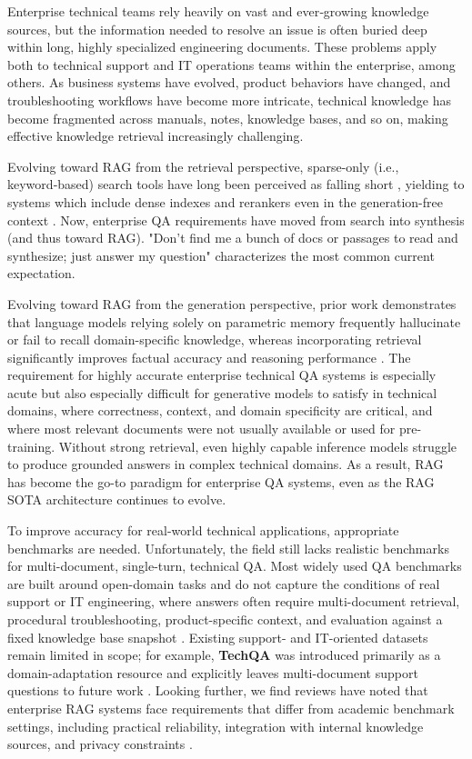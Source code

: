 \documentclass[11pt]{article}
\begin{document}
Enterprise technical teams rely heavily on vast and ever‑growing
knowledge sources, but the information needed to resolve an issue is often
buried deep within long, highly specialized engineering documents. These problems
apply both to technical support and IT operations teams within the enterprise,
among others. As business systems have evolved, product behaviors have changed, and 
troubleshooting workflows have become more intricate, technical knowledge has 
become fragmented across manuals, notes, knowledge bases, and so on, making 
effective knowledge retrieval increasingly challenging.

Evolving toward RAG from the retrieval perspective, sparse-only (i.e., 
keyword‑based) search tools have long been perceived as falling short 
\citep{}, yielding to systems which include dense indexes and rerankers even 
in the generation-free context \citep{}\citep{}. Now, enterprise QA requirements have 
moved from search into synthesis (and thus toward RAG). "Don't find me a 
bunch of docs or passages to read and synthesize; just answer my question" 
characterizes the most common current expectation.

Evolving toward RAG from the generation perspective, prior work demonstrates 
that language models relying solely on parametric 
memory frequently hallucinate or fail to recall domain-specific 
knowledge, whereas incorporating retrieval significantly improves factual 
accuracy and reasoning performance 
\citep{lewis2020}\citep{izacard2021}\citep{borgeaud2022}.
The requirement for highly accurate enterprise technical QA systems is
especially acute but also especially difficult for generative models to 
satisfy in technical domains, where correctness, context, and domain 
specificity are critical, and where most relevant documents were not usually 
available or used for pre-training. Without strong 
retrieval, even highly capable inference models struggle to produce grounded 
answers in complex technical domains. As a result, RAG has become the go-to 
paradigm for enterprise QA systems, even as the RAG SOTA architecture 
continues to evolve.

To improve accuracy for real-world technical applications, appropriate 
benchmarks are needed. Unfortunately, the field still lacks realistic 
benchmarks for multi-document, single-turn, technical QA. Most widely 
used QA benchmarks are built around open-domain tasks and do not capture the 
conditions of real support or IT engineering, where answers often require 
multi-document retrieval, procedural
troubleshooting, product-specific context, and evaluation against a
fixed knowledge base snapshot \citep{cohen2025}. Existing
support- and IT-oriented datasets remain limited in scope; for example, \textbf{TechQA}
was introduced primarily as a domain-adaptation resource and explicitly
leaves multi-document support questions to future work \citep{castelli2020}.
Looking further, we find reviews 
have noted that enterprise RAG systems face requirements that differ from 
academic benchmark settings, including practical reliability, integration with
internal knowledge sources, and privacy constraints \citep{oche2025}.
\end{document}
